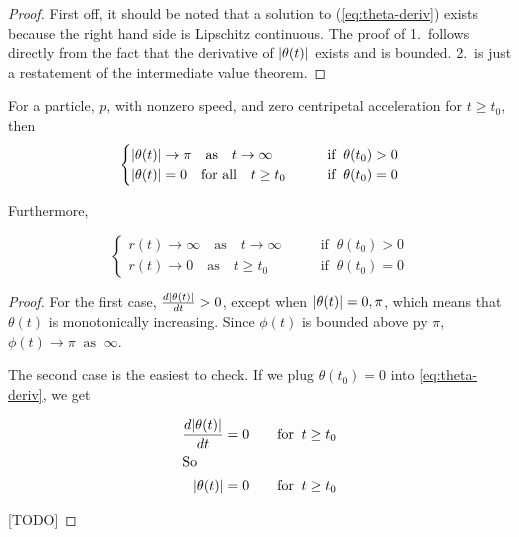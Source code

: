 \begin{proof}
First off, it should be noted that a solution to (\ref{eq:theta-deriv}) exists because the right hand side is Lipschitz continuous. The proof of 1.\ follows directly from the fact that the derivative of $\abs{\theta(t)}$ exists and is bounded. 2.\ is just a restatement of the intermediate value theorem.
\end{proof}

\begin{lemma}\label{lemma:polar-assymptote}
  For a particle, $p$, with nonzero speed, and zero centripetal acceleration for $t \ge t_0$, then
  \[
    \begin{cases}
      \abs{\theta(t)} \to \pi \quad \text{as} \quad t \to \infty \qquad &\text{if} \;\; \theta(t_0) > 0\\
      \abs{\theta(t)} = 0 \quad \text{for all} \quad t \ge t_0 \qquad &\text{if} \;\; \theta(t_0) = 0
    \end{cases}
  \]

    Furthermore,

  \[
    \begin{cases}
      r(t) \to \infty \quad \text{as} \quad t \to \infty \qquad &\text{if} \;\; \theta(t_0) > 0\\
      r(t) \to 0 \quad \text{as} \quad t \ge t_0 \qquad &\text{if} \;\; \theta(t_0) = 0
    \end{cases}
  \]
\end{lemma}

\begin{proof}

For the first case, $\frac{d\abs{\theta(t)}}{dt} > 0$, except when $\abs{\theta(t)} = 0, \pi$, which means that $\theta(t)$ is monotonically increasing. Since $\phi(t)$ is bounded above py $\pi$, $\phi(t) \to \pi \;\; \text{as} \;\; \infty$.

The second case is the easiest to check. If we plug $\theta(t_0) = 0$ into \ref{eq:theta-deriv}, we get

\begin{align*}
\frac{d\abs{\theta(t)}}{dt} = 0 \qquad \text{for} \;\; t \ge t_0\\
\intertext{So}
\abs{\theta(t)} = 0 \qquad \text{for} \;\; t \ge t_0
\end{align*}

[TODO]

\end{proof}
